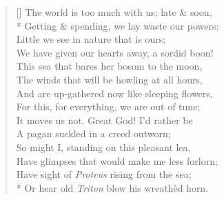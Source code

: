 \documentclass[MAIN]{subfiles}
\begin{document}
\settowidth{\versewidth}{The world is too much with us; late \& soon,}
\begin{verse}[\versewidth]
The world is too much with us; late \& soon,\\*
Getting \& spending, we lay waste our powers;\\
Little we see in nature that is ours;\\
We have given our hearts away, a sordid boon!\\
This sea that bares her bosom to the moon,\\
The winds that will be howling at all hours,\\
And are up-gathered now like sleeping flowers,\\
For this, for everything, we are out of tune;\\
It moves us not. Great God! I'd rather be\\
A pagan suckled in a creed outworn;\\
So might I, standing on this pleasant lea,\\
Have glimpses that would make me less forlorn;\\
Have sight of \emph{Proteus} rising from the sea;\\*
Or hear old \emph{Triton} blow his wreath\`ed horn.
\end{verse}
\end{document}
